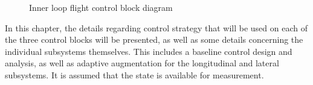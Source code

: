 \begin{figure}[h]
\begin{center}
    \caption{Inner loop flight control block diagram\label{innercont_block_fig}}
  \end{center}
\end{figure}

In this chapter, the details regarding control strategy that will be used on each of the three control blocks will be presented, as well as some details concerning the individual subsystems themselves.
This includes a baseline control design and analysis, as well as adaptive augmentation for the longitudinal and lateral subsystems.
It is assumed that the state is available for measurement.

